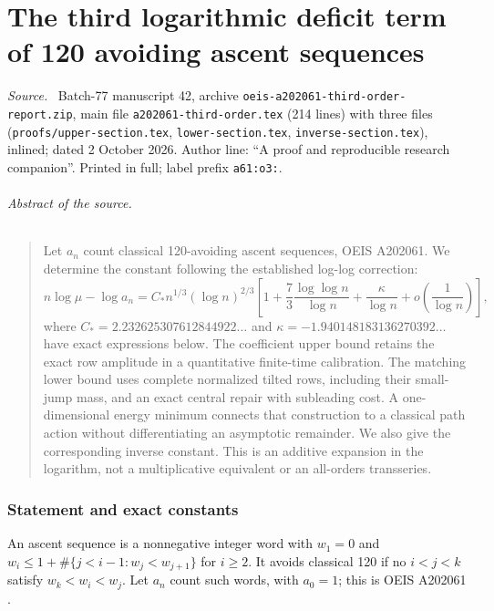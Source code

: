 \documentclass[11pt,letterpaper]{article}
\numberwithin{equation}{section}
\theoremstyle{remark}\newtheorem{remark}[theorem]{Remark}
\newenvironment{partsource}{\par\medskip\noindent\begin{minipage}{\linewidth}\small\raggedright\textit{Source.}\ }{\end{minipage}\par\medskip}
\begin{document}
\part{The third logarithmic deficit term of 120 avoiding ascent sequences}\label{a61:part:o3}

\begin{partsource}
Batch-77 manuscript 42, archive \texttt{oeis-a202061-third-order-report.zip}, main file \texttt{a202061-third-order.tex} (214 lines) with three \verb|| files (\texttt{proofs/upper-section.tex}, \texttt{lower-section.tex}, \texttt{inverse-section.tex}), inlined; dated 2 October 2026. Author line: ``A proof and reproducible research companion''. Printed in full; label prefix \texttt{a61:o3:}.
\end{partsource}

\paragraph{Abstract of the source.}
\begin{quote}\small
Let $a_n$ count classical 120-avoiding ascent sequences, OEIS A202061.
We determine the constant following the established log-log correction:
\[
 n\log\mu-\log a_n
 =C_*n^{1/3}(\log n)^{2/3}
 \left[1+\frac73\frac{\log\log n}{\log n}
         +\frac\kappa{\log n}
         +o\!\left(\frac1{\log n}\right)\right],
\]
where $C_*=2.232625307612844922\ldots$ and
$\kappa=-1.940148183136270392\ldots$ have exact expressions below.
The coefficient upper bound retains the exact row amplitude in a
quantitative finite-time calibration. The matching lower bound uses
complete normalized tilted rows, including their small-jump mass, and
an exact central repair with subleading cost. A one-dimensional energy
minimum connects that construction to a classical path action without
differentiating an asymptotic remainder. We also give the corresponding
inverse constant. This is an additive expansion in the logarithm, not
a multiplicative equivalent or an all-orders transseries.
\end{quote}

\section{Statement and exact constants}
An ascent sequence is a nonnegative integer word with $w_1=0$ and
$w_i\le1+\#\{j<i-1:w_j<w_{j+1}\}$ for $i\ge2$. It avoids classical
120 if no $i<j<k$ satisfy $w_k<w_i<w_j$. Let $a_n$ count such words,
with $a_0=1$; this is OEIS A202061 \cite{OEIS}.
\end{document}
